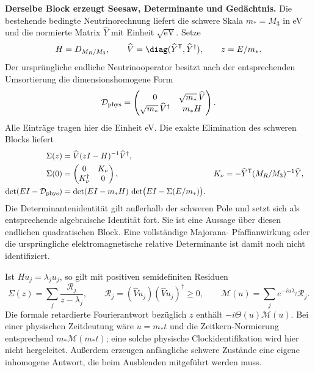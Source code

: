 \textbf{Derselbe Block erzeugt Seesaw, Determinante und Gedächtnis.}
Die bestehende bedingte Neutrinorechnung liefert die schwere Skala
$m_*=M_3$ in eV und die normierte Matrix $\widehat Y$ mit Einheit
$\sqrt{\mathrm{eV}}$. Setze
\begin{equation}
H=D_{M_R/M_3},\qquad
\widehat V=\diag(\widehat Y^{\mathsf T},\widehat Y^\dagger),\qquad
z=E/m_*.
\end{equation}
Der ursprüngliche endliche Neutrinooperator besitzt nach der entsprechenden
Umsortierung die dimensionshomogene Form
\begin{equation}
\mathcal D_{\rm phys}=
\begin{pmatrix}
0&\sqrt{m_*}\,\widehat V\\
\sqrt{m_*}\,\widehat V^\dagger&m_*H
\end{pmatrix}.
\end{equation}
Alle Einträge tragen hier die Einheit eV. Die exakte Elimination des
schweren Blocks liefert
\begin{align}
\Sigma(z)&=\widehat V(zI-H)^{-1}\widehat V^\dagger,\\
\Sigma(0)&=\begin{pmatrix}0&K_\nu\\K_\nu^\dagger&0\end{pmatrix},
&K_\nu&=-\widehat Y^{\mathsf T}(M_R/M_3)^{-1}\widehat Y,\\
\det(EI-\mathcal D_{\rm phys})
&=\det(EI-m_*H)\,
\det\bigl(EI-\Sigma(E/m_*)\bigr).
\end{align}
Die Determinantenidentität gilt außerhalb der schweren Pole und setzt sich
als entsprechende algebraische Identität fort. Sie ist eine Aussage über
diesen endlichen quadratischen Block. Eine vollständige Majorana-
Pfaffianwirkung oder die ursprüngliche elektromagnetische relative
Determinante ist damit noch nicht identifiziert.

Ist $Hu_j=\lambda_j u_j$, so gilt mit positiven semidefiniten Residuen
\begin{equation}
\Sigma(z)=\sum_j\frac{\mathcal R_j}{z-\lambda_j},\qquad
\mathcal R_j=(\widehat V u_j)(\widehat V u_j)^\dagger\ge0,\qquad
\mathcal M(u)=\sum_j e^{-iu\lambda_j}\mathcal R_j.
\end{equation}
Die formale retardierte Fourierantwort bezüglich $z$ enthält
$-i\Theta(u)\mathcal M(u)$. Bei einer physischen Zeitdeutung wäre
$u=m_*t$ und die Zeitkern-Normierung entsprechend $m_*\mathcal M(m_*t)$;
eine solche physische Clockidentifikation wird hier nicht hergeleitet.
Außerdem erzeugen anfängliche schwere Zustände eine eigene inhomogene
Antwort, die beim Ausblenden mitgeführt werden muss.

